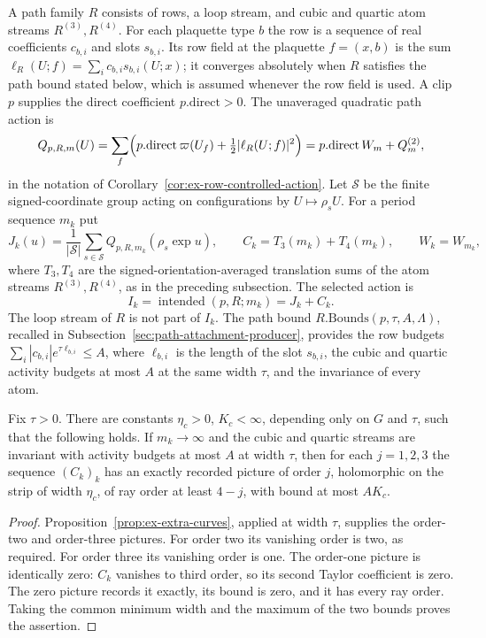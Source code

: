 A path family $R$ consists of rows, a loop stream, and cubic and
quartic atom streams $R^{(3)},R^{(4)}$. For each plaquette type $b$ the
row is a sequence of real coefficients $c_{b,i}$ and slots $s_{b,i}$.
Its row field at the plaquette $f=(x,b)$ is the sum
$\ell_R(U;f)=\sum_ic_{b,i}s_{b,i}(U;x)$; it converges absolutely when
$R$ satisfies the path bound stated below, which is assumed whenever
the row field is used. A clip $p$ supplies the
direct coefficient $p.\mathrm{direct}>0$. The unaveraged quadratic
path action is
\[
 Q_{p,R,m}(U)=\sum_f\Bigl(p.\mathrm{direct}\,\varpi(U_f)
                  +\tfrac12|\ell_R(U;f)|^2\Bigr)
   =p.\mathrm{direct}\,W_m+Q^{(2)}_m ,
\]
in the notation of Corollary~\ref{cor:ex-row-controlled-action}. Let
$\mathcal S$ be the finite signed-coordinate group acting on
configurations by $U\mapsto\rho_sU$. For a period sequence $m_k$ put
\[
 J_k(u)=\frac1{|\mathcal S|}\sum_{s\in\mathcal S}
              Q_{p,R,m_k}(\rho_s\exp u),\qquad
 C_k=T_3(m_k)+T_4(m_k),\qquad W_k=W_{m_k},
\]
where $T_3,T_4$ are the signed-orientation-averaged translation sums of
the atom streams $R^{(3)},R^{(4)}$, as in the preceding subsection. The
selected action is
\[
 I_k=\operatorname{intended}(p,R;m_k)=J_k+C_k .
\]
The loop stream of $R$ is not part of $I_k$. The path bound
$R.\mathrm{Bounds}(p,\tau,A,\Lambda)$, recalled in
Subsection~\ref{sec:path-attachment-producer}, provides the row budgets
$\sum_i|c_{b,i}|e^{\tau\ell_{b,i}}\leq A$, where $\ell_{b,i}$ is the
length of the slot $s_{b,i}$, the cubic and quartic activity budgets at
most $A$ at the same width $\tau$, and the invariance of every atom.

\begin{proposition}
\label{prop:ex-veneer}
Fix $\tau>0$. There are constants $\eta_c>0$, $K_c<\infty$, depending
only on $G$ and $\tau$, such that the following holds. If $m_k\to\infty$
and the cubic and quartic streams are invariant with activity budgets
at most $A$ at width $\tau$, then for each $j=1,2,3$ the sequence
$(C_k)_k$ has an exactly recorded picture of order $j$, holomorphic on
the strip of width $\eta_c$, of ray order at least $4-j$, with bound at
most $A K_c$.
\end{proposition}

\begin{proof}
Proposition~\ref{prop:ex-extra-curves}, applied at width $\tau$,
supplies the order-two and order-three pictures. For order two its
vanishing order is two, as required. For order three its vanishing order
is one. The order-one picture is identically zero: $C_k$ vanishes to
third order, so its second Taylor coefficient is zero. The zero picture
records it exactly, its bound is zero, and it has every ray order.
Taking the common minimum width and the maximum of the two bounds proves
the assertion.
\end{proof}

